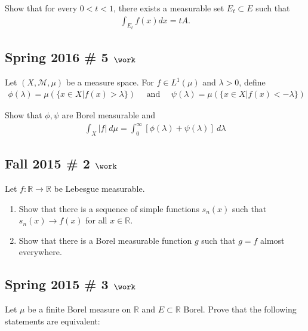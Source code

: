 Show that for every \(0 < t < 1\), there exists a measurable set
\(E_t \subset E\) such that
\begin{align*}
\int_{E_{t}} f(x) d x=t A.
\end{align*}

\hypertarget{spring-2016-5-work}{%
\subsection{\texorpdfstring{Spring 2016 \# 5
\(\work\)}{Spring 2016 \# 5 \textbackslash work}}\label{spring-2016-5-work}}

Let \((X, \mathcal M, \mu)\) be a measure space. For \(f\in L^1(\mu)\)
and \(\lambda > 0\), define
\begin{align*}
\phi(\lambda)=\mu(\{x \in X | f(x)>\lambda\}) 
\quad \text { and } \quad 
\psi(\lambda)=\mu(\{x \in X | f(x)<-\lambda\})
\end{align*}

Show that \(\phi, \psi\) are Borel measurable and
\begin{align*}
\int_{X}|f| ~d \mu=\int_{0}^{\infty}[\phi(\lambda)+\psi(\lambda)] ~d \lambda
\end{align*}

\hypertarget{fall-2015-2-work}{%
\subsection{\texorpdfstring{Fall 2015 \# 2
\(\work\)}{Fall 2015 \# 2 \textbackslash work}}\label{fall-2015-2-work}}

Let \(f: {\mathbb{R}}\to {\mathbb{R}}\) be Lebesgue measurable.

\begin{enumerate}
\def\labelenumi{\arabic{enumi}.}
\tightlist
\item
  Show that there is a sequence of simple functions \(s_n(x)\) such that
  \(s_n(x) \to f(x)\) for all \(x\in {\mathbb{R}}\).
\item
  Show that there is a Borel measurable function \(g\) such that
  \(g = f\) almost everywhere.
\end{enumerate}

\hypertarget{spring-2015-3-work}{%
\subsection{\texorpdfstring{Spring 2015 \# 3
\(\work\)}{Spring 2015 \# 3 \textbackslash work}}\label{spring-2015-3-work}}

Let \(\mu\) be a finite Borel measure on \({\mathbb{R}}\) and
\(E \subset {\mathbb{R}}\) Borel. Prove that the following statements
are equivalent:

